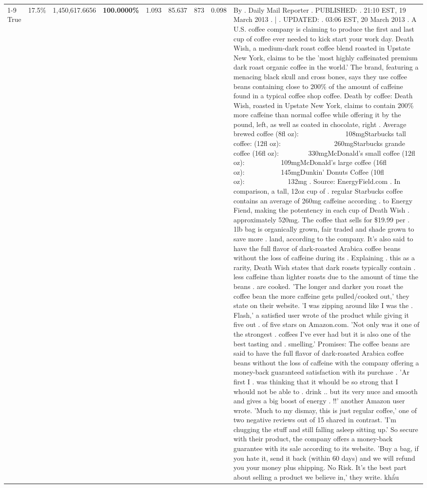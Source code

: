 \begin{table}[H]
{\begin{tabular}{lllrlllll}
\cline{1-9} \cline{2-9}
True & 17.5\% & 1,450,617.6656 & \bfseries \color{red} 100.0000\% & 1.093 & 85.637 & 873 & 0.098 & By . Daily Mail Reporter . PUBLISHED: . 21:10 EST, 19 March 2013 . | . UPDATED: . 03:06 EST, 20 March 2013 . A U.S. coffee company is claiming to produce the first and last cup of coffee ever needed to kick start your work day. Death Wish, a medium-dark roast coffee blend roasted in Upstate New York, claims to be the 'most highly caffeinated premium dark roast organic coffee in the world.' The brand, featuring a menacing black skull and cross bones, says they use coffee beans containing close to 200\% of the amount of caffeine found in a typical coffee shop coffee. Death by coffee: Death Wish, roasted in Upstate New York, claims to contain 200\% more caffeine than normal coffee while offering it by the pound, left, as well as coated in chocolate, right . Average brewed coffee (8fl oz):              108mgStarbucks tall coffee: (12fl oz):                260mgStarbucks grande coffee (16fl oz):         330mgMcDonald's small coffee (12fl oz):           109mgMcDonald's large coffee (16fl oz):           145mgDunkin' Donuts Coffee (10fl oz):             132mg . Source: EnergyField.com . In comparison, a tall, 12oz cup of . regular Starbucks coffee contains an average of 260mg caffeine according . to Energy Fiend, making the potentency in each cup of Death Wish . approximately 520mg. The coffee that sells for \$19.99 per . 1lb bag is organically grown, fair traded and shade grown to save more . land, according to the company. It's also said to have the full flavor of dark-roasted Arabica coffee beans without the loss of caffeine during its . Explaining . this as a rarity, Death Wish states that dark roasts typically contain . less caffeine than lighter roasts due to the amount of time the beans . are cooked. 'The longer and darker you roast the coffee bean the more caffeine gets pulled/cooked out,' they state on their website. 'I was zipping around like I was the . Flash,' a satisfied user wrote of the product while giving it five out . of five stars on Amazon.com. 'Not only was it one of the strongest . coffees I've ever had but it is also one of the best tasting and . smelling.’ Promises: The coffee beans are said to have the full flavor of dark-roasted Arabica coffee beans without the loss of caffeine with the company offering a money-back guaranteed satisfaction with its purchase . 'Ar first I . was thinking that it whould be so strong that I whould not be able to . drink .. but its very nuce and smooth and gives a big boost of energy . !!' another Amazon user wrote. 'Much to my dismay, this is just regular coffee,' one of two negative reviews out of 15 shared in contrast. 'I'm chugging the stuff and still falling asleep sitting up.' So secure with their product, the company offers a money-back guarantee with its sale according to its website. 'Buy a bag, if you hate it, send it back (within 60 days) and we will refund you your money plus shipping. No Risk. It’s the best part about selling a product we believe in,' they write. khẩu \\

\end{tabular}}
\end{table}
